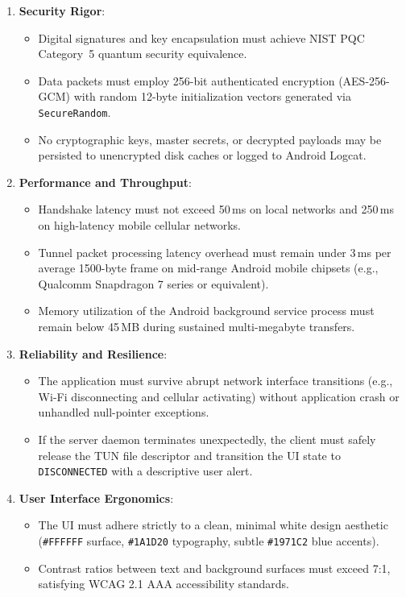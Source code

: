 \begin{enumerate}[label=\textbf{NFR-\arabic*.}]
    \item \textbf{Security Rigor}:
    \begin{itemize}
        \item Digital signatures and key encapsulation must achieve NIST PQC Category~5 quantum security equivalence.
        \item Data packets must employ 256-bit authenticated encryption (AES-256-GCM) with random 12-byte initialization vectors generated via \texttt{SecureRandom}.
        \item No cryptographic keys, master secrets, or decrypted payloads may be persisted to unencrypted disk caches or logged to Android Logcat.
    \end{itemize}
    \item \textbf{Performance and Throughput}:
    \begin{itemize}
        \item Handshake latency must not exceed 50\,ms on local networks and 250\,ms on high-latency mobile cellular networks.
        \item Tunnel packet processing latency overhead must remain under 3\,ms per average 1500-byte frame on mid-range Android mobile chipsets (e.g., Qualcomm Snapdragon 7 series or equivalent).
        \item Memory utilization of the Android background service process must remain below 45\,MB during sustained multi-megabyte transfers.
    \end{itemize}
    \item \textbf{Reliability and Resilience}:
    \begin{itemize}
        \item The application must survive abrupt network interface transitions (e.g., Wi-Fi disconnecting and cellular activating) without application crash or unhandled null-pointer exceptions.
        \item If the server daemon terminates unexpectedly, the client must safely release the TUN file descriptor and transition the UI state to \texttt{DISCONNECTED} with a descriptive user alert.
    \end{itemize}
    \item \textbf{User Interface Ergonomics}:
    \begin{itemize}
        \item The UI must adhere strictly to a clean, minimal white design aesthetic (\texttt{\#FFFFFF} surface, \texttt{\#1A1D20} typography, subtle \texttt{\#1971C2} blue accents).
        \item Contrast ratios between text and background surfaces must exceed 7:1, satisfying WCAG 2.1 AAA accessibility standards.
    \end{itemize}
\end{enumerate}

